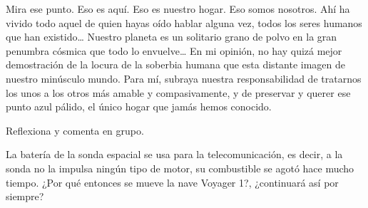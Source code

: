 \documentclass[11pt]{book}
\begin{document}
\begin{boxK}
    \begin{boxF}
        Mira ese punto. Eso es aquí. Eso es nuestro hogar. Eso somos nosotros.
        Ahí ha vivido todo aquel de quien hayas oído hablar alguna vez,
        todos los seres humanos que han existido\dots
        Nuestro planeta es un solitario grano de polvo en la gran penumbra
        cósmica que todo lo envuelve\dots
        En mi opinión, no hay quizá mejor demostración
        de la locura de la soberbia humana que esta distante imagen de nuestro minúsculo
        mundo. Para mí, subraya nuestra responsabilidad de tratarnos los unos a los
        otros más amable y compasivamente, y de preservar y querer ese punto azul pálido,
        el único hogar que jamás hemos conocido.
    \end{boxF}

    Reflexiona y comenta en grupo.

    La batería de la sonda espacial se usa para la telecomunicación, es decir, a la sonda no la impulsa ningún tipo de motor, su combustible se agotó hace mucho tiempo. ¿Por qué entonces se mueve la nave Voyager 1?, ¿continuará así por siempre?
\end{boxK}
\end{document}
